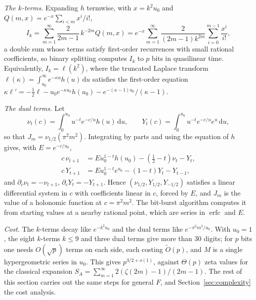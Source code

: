 \documentclass[11pt,reqno]{amsart}
\theoremstyle{definition}
\theoremstyle{remark}
\newcommand{\erfc}{\operatorname{erfc}}
\newcommand{\dd}{\,\mathrm{d}}
\begin{document}
\emph{The $k$-terms.} Expanding $h$ termwise, with $x = k^2u_0$ and $Q(m,x) = e^{-x}\sum_{i<m}x^i/i!$,
\[
  I_k = \sum_{m=1}^{\infty}\frac{2}{2m-1}\,k^{-2m}Q(m,x) = e^{-x}\sum_{m=1}^{\infty}\frac{2}{(2m-1)k^{2m}}\sum_{i=0}^{m-1}\frac{x^i}{i!},
\]
a double sum whose terms satisfy first-order recurrences with small rational coefficients, so binary splitting
computes $I_k$ to $p$ bits in quasilinear time. Equivalently, $I_k = \ell(k^2)$, where the truncated Laplace transform
$\ell(\kappa) = \int_{u_0}^\infty e^{-\kappa u}h(u)\dd u$ satisfies the first-order equation
$\kappa\ell' = -\frac12\ell - u_0e^{-\kappa u_0}h(u_0) - e^{-(\kappa-1)u_0}/(\kappa-1)$.

\emph{The dual terms.} Let
\[
  \nu_t(c) = \int_0^{u_0}u^{-t}e^{-c/u}h(u)\dd u, \qquad Y_t(c) = \int_0^{u_0}u^{-t}e^{-c/u}e^u\dd u,
\]
so that $J_m = \nu_{1/2}(\pi^2m^2)$. Integrating by parts and using the equation of $h$ gives, with
$E = e^{-c/u_0}$,
\begin{align*}
  c\,\nu_{t+1} &= Eu_0^{1-t}h(u_0) - (\tfrac12 - t)\nu_t - Y_t, \\
  c\,Y_{t+1} &= Eu_0^{1-t}e^{u_0} - (1-t)Y_t - Y_{t-1},
\end{align*}
and $\partial_c\nu_t = -\nu_{t+1}$, $\partial_cY_t = -Y_{t+1}$. Hence $(\nu_{1/2}, Y_{1/2}, Y_{-1/2})$ satisfies a linear
differential system in $c$ with coefficients linear in $c$, forced by $E$, and $J_m$ is the value of a holonomic
function at $c = \pi^2m^2$. The bit-burst algorithm computes it from starting values at a nearby rational point,
which are series in $\erfc$ and $E$.

\emph{Cost.} The $k$-terms decay like $e^{-k^2u_0}$ and the dual terms like $e^{-\pi^2m^2/u_0}$. With $u_0 = 1$, the
eight $k$-terms $k \le 9$ and three dual terms give more than $30$ digits; for $p$ bits one needs
$O(\sqrt p)$ terms on each side, each costing $\widetilde O(p)$, and $M$ is a single hypergeometric series in $u_0$.
This gives $p^{3/2+o(1)}$, against $\Theta(p)$ zeta values for the classical expansion
$S_A = \sum_{m=1}^{\infty}2(\zeta(2m)-1)/(2m-1)$. The rest of this section carries out the same steps for general
$F$, and Section~\ref{sec:complexity} the cost analysis.
\end{document}
